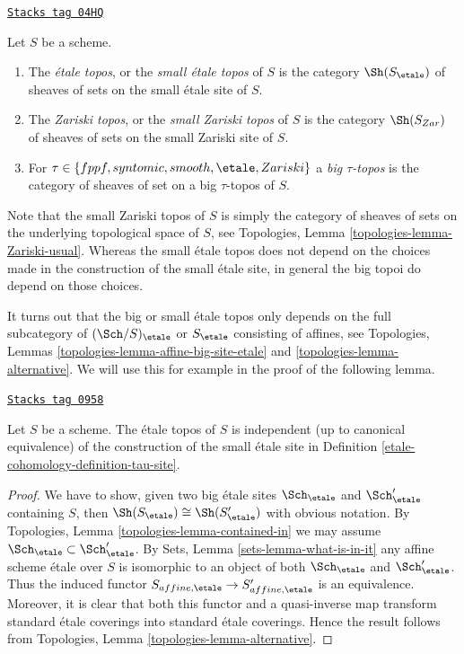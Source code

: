 \begin{definition}
\label{etale-cohomology-definition-etale-topos}
\href{https://stacks.math.columbia.edu/tag/04HQ}{\texttt{Stacks tag 04HQ}}

Let $S$ be a scheme.
\begin{enumerate}
\item The {\it \'etale topos}, or the {\it small \'etale topos}
of $S$ is the category $\Sh(S_\etale)$ of sheaves of sets on
the small \'etale site of $S$.
\item The {\it Zariski topos}, or the {\it small Zariski topos}
of $S$ is the category $\Sh(S_{Zar})$ of sheaves of sets on the
small Zariski site of $S$.
\item For $\tau \in \{fppf, syntomic, smooth, \etale, Zariski\}$ a
{\it big $\tau$-topos} is the category of sheaves of set on a
big $\tau$-topos of $S$.
\end{enumerate}
\end{definition}

Note that the small Zariski topos of $S$ is simply the category of sheaves
of sets on the underlying topological space of $S$, see
Topologies, Lemma \ref{topologies-lemma-Zariski-usual}.
Whereas the small \'etale topos does not depend on the choices made in the
construction of the small \'etale site, in general the big topoi do depend
on those choices.

\medskip\noindent
It turns out that the big or small \'etale topos only depends on the
full subcategory of $(\Sch/S)_\etale$ or $S_\etale$ consisting of
affines, see
Topologies, Lemmas \ref{topologies-lemma-affine-big-site-etale} and
\ref{topologies-lemma-alternative}.
We will use this for example in the proof of the following lemma.

\begin{lemma}
\label{etale-cohomology-lemma-etale-topos-independent-partial-universe}
\href{https://stacks.math.columbia.edu/tag/0958}{\texttt{Stacks tag 0958}}

Let $S$ be a scheme. The \'etale topos of $S$ is independent
(up to canonical equivalence) of the construction of the small
\'etale site in Definition \ref{etale-cohomology-definition-tau-site}.
\end{lemma}

\begin{proof}
We have to show, given two big \'etale sites
$\Sch_\etale$ and $\Sch_\etale'$ containing
$S$, then $\Sh(S_\etale) \cong \Sh(S_\etale')$
with obvious notation. By Topologies, Lemma \ref{topologies-lemma-contained-in}
we may assume $\Sch_\etale \subset \Sch_\etale'$.
By Sets, Lemma \ref{sets-lemma-what-is-in-it}
any affine scheme \'etale over $S$ is isomorphic to an object
of both $\Sch_\etale$ and $\Sch_\etale'$.
Thus the induced functor
$S_{affine, \etale} \to S_{affine, \etale}'$
is an equivalence. Moreover, it is clear that both this functor
and a quasi-inverse map transform standard \'etale coverings into
standard \'etale coverings.
Hence the result follows from
Topologies, Lemma \ref{topologies-lemma-alternative}.
\end{proof}

